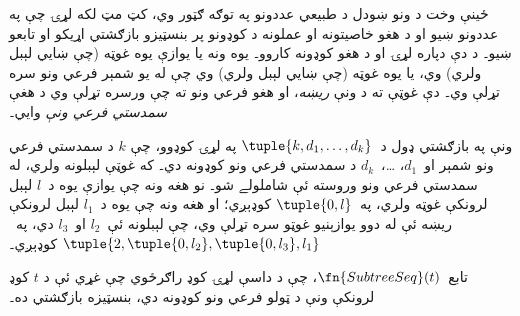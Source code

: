 \documentclass[../../../include/open-logic-section]{subfiles}
\begin{document}

ځينې وخت د ونو ښودل د طبيعي عددونو په توګه ګټور وي، کټ مټ لکه لړۍ چې په عددونو ښيو او د هغو خاصيتونه او عملونه د کوډونو پر بنسټيزو بازګشتي اړيکو او تابعو ښيو۔ د دې دپاره لړۍ او د هغو کوډونه کاروو۔ يوه ونه يا يوازې يوه غوټه (چې ښايي لېبل ولري) وي، يا يوه غوټه (چې ښايي لېبل ولري) وي چې له يو شمېر فرعي ونو سره تړلې وي۔ دې غوټې ته د ونې \emph{ريښه}، او هغو فرعي ونو ته چې ورسره تړلې وي د هغې \emph{سمدستي فرعي ونې} وايي۔

ونې په بازګشتي ډول د~$\tuple{k, d_1, \dots, d_k}$ په لړۍ کوډوو، چې $k$ د سمدستي فرعي ونو شمېر او~$d_1$، \dots،~$d_k$ د سمدستي فرعي ونو کوډونه دي۔ که غوټې لېبلونه ولري، له سمدستي فرعي ونو وروسته ئې شاملولے شو۔ نو هغه ونه چې يوازې يوه د~$l$ لېبل لرونکې غوټه ولري، په~$\tuple{0,l}$ کوډېږي؛ او هغه ونه چې يوه د~$l_1$ لېبل لرونکې ريښه ئې له دوو يوازېنيو غوټو سره تړلې وي، چې لېبلونه ئې~$l_2$ او~$l_3$ دي، په~$\tuple{2, \tuple{0, l_2}, \tuple{0, l_3}, l_1}$ کوډېږي۔

\begin{prop}
  تابع~$\fn{SubtreeSeq}(t)$، چې د داسې لړۍ کوډ راګرځوي چې غړي ئې د $t$ کوډ لرونکې ونې د ټولو فرعي ونو کوډونه دي، بنسټيزه بازګشتي ده۔
\end{prop}
\end{document}
